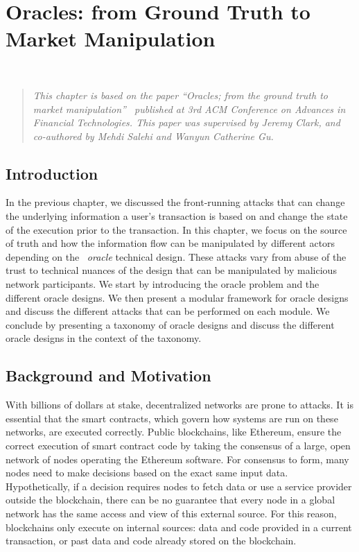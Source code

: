 \chapter{Oracles: from Ground Truth to Market Manipulation} ~\label{sec:oracles}

\begin{quote}
	\textit{This chapter is based on the paper ``Oracles; from the ground truth to market manipulation''~\cite{eskandari2021sok} published at 3rd ACM Conference on Advances in Financial Technologies. This paper was supervised by Jeremy Clark, and co-authored by Mehdi Salehi and Wanyun Catherine Gu.}
\end{quote}

\section{Introduction}

In the previous chapter, we discussed the front-running attacks that can change the underlying information a user's transaction is based on and change the state of the execution prior to the transaction. In this chapter, we focus on the source of truth and how the information flow can be manipulated by different actors depending on the ~\textit{oracle} technical design. These attacks vary from abuse of the trust to technical nuances of the design that can be manipulated by malicious network participants. We start by introducing the oracle problem and the different oracle designs. We then present a modular framework for oracle designs and discuss the different attacks that can be performed on each module. We conclude by presenting a taxonomy of oracle designs and discuss the different oracle designs in the context of the taxonomy. 


\section{Background and Motivation}


With billions of dollars at stake, decentralized networks are prone to attacks. It is essential that the smart contracts, which govern how systems are run on these networks, are executed correctly. Public blockchains, like Ethereum, ensure the correct execution of smart contract code by taking the consensus of a large, open network of nodes operating the Ethereum software. For consensus to form, many nodes need to make decisions based on the exact same input data. Hypothetically, if a decision requires nodes to fetch data or use a service provider outside the blockchain, there can be no guarantee that every node in a global network has the same access and view of this external source. For this reason, blockchains only execute on internal sources: data and code provided in a current transaction, or past data and code already stored on the blockchain.

